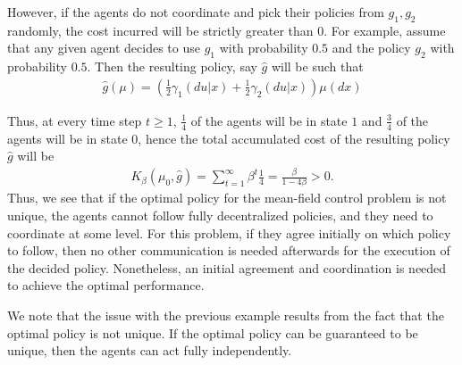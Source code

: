 \documentclass[twoside,11pt]{article}
\begin{document}
\begin{example}
However, if the agents do not coordinate and pick their policies from $g_1,g_2$ randomly, the cost incurred will be strictly greater than $0$. For example, assume that any given agent decides to use $g_1$ with probability $0.5$ and the policy $g_2$ with probability $0.5$. Then the resulting policy, say $\hat{g}$ will be such that 
\begin{align*}
\hat{g}(\mu)= \left(\frac{1}{2}\gamma_1(du|x) + \frac{1}{2}\gamma_2(du|x)\right)\mu(dx)
\end{align*}



Thus, at every time step $t \geq 1$, $\frac{1}{4}$ of the agents will be in state $1$ and $\frac{3}{4}$ of the agents will be in state $0$, hence the total accumulated cost of the resulting policy $\hat{g}$ will be 
\begin{align*}
K_\beta(\mu_0,\hat{g}) = \sum_{t=1}^\infty \beta^t \frac{1}{4} = \frac{\beta}{1-4\beta}>0.
\end{align*}
Thus, we see that if the optimal policy for the mean-field control problem is not unique, the agents cannot follow fully decentralized policies, and they need to coordinate at some level. For this problem, if they agree initially on which policy to follow, then no other communication is needed afterwards for the execution of the decided policy. Nonetheless, an initial agreement and coordination is needed to achieve the optimal performance.
\end{example}

We note that the issue with the previous example results from the fact that the optimal policy is not unique. If the optimal policy can be guaranteed to be unique, then the agents can act fully independently.



\end{document}
